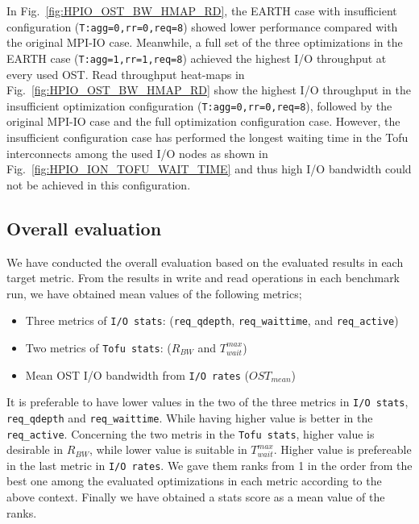 \documentclass{jhps}
\begin{document}
%
In Fig.~\ref{fig:HPIO_OST_BW_HMAP_RD}, the EARTH case with insufficient configuration
({\tt T:agg=0,rr=0,req=8}) showed lower performance compared with the original MPI-IO case.
Meanwhile, a full set of the three optimizations in the EARTH case
({\tt T:agg=1,rr=1,req=8}) achieved the highest I/O throughput at every used OST. 
Read throughput heat-maps in Fig.~\ref{fig:HPIO_OST_BW_HMAP_RD} show
the highest I/O throughput in the insufficient optimization configuration
({\tt T:agg=0,rr=0,req=8}), followed by the original MPI-IO case
and the full optimization configuration case.
However, the insufficient configuration case has performed the longest waiting time
in the Tofu interconnects among the used I/O nodes as shown in
Fig.~\ref{fig:HPIO_ION_TOFU_WAIT_TIME}
and thus high I/O bandwidth could not be achieved in this configuration.

\subsection{Overall evaluation}
\label{ssec:overall_eval}

We have conducted the overall evaluation based on the evaluated results
in each target metric.
From the results in write and read operations in each benchmark run,
we have obtained mean values of the following metrics;
%
\begin{itemize}
\item Three metrics of {\tt I/O stats}:
({\tt req\_qdepth}, {\tt req\_waittime}, and {\tt req\_active})
\item Two metrics of {\tt Tofu stats}: ($R_{BW}$ and $T_{wait}^{max}$)
\item Mean OST I/O bandwidth from {\tt I/O rates} ($OST_{mean}$)
\end{itemize}
%
It is preferable to have lower values in the two of the three metrics
in {\tt I/O stats}, {\tt req\_qdepth} and {\tt req\_waittime}.
While having higher value is better in the {\tt req\_active}.
Concerning the two metris in the {\tt Tofu stats},
higher value is desirable in $R_{BW}$, while lower value is
suitable in $T_{wait}^{max}$.
Higher value is prefereable in the last metric in {\tt I/O rates}.
We gave them ranks from 1 in the order from the best one
among the evaluated optimizations in each metric according to
the above context.
Finally we have obtained a stats score as a mean value of the ranks.
\end{document}

